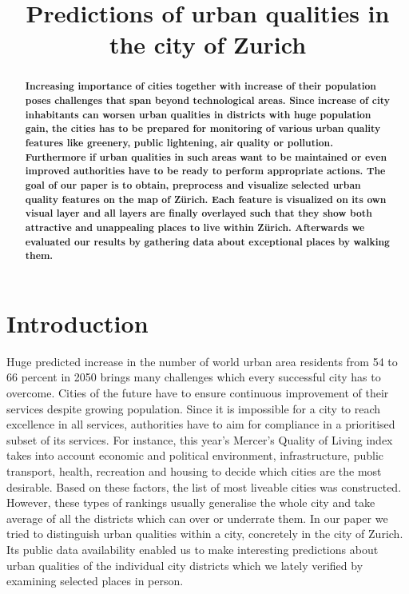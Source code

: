 \documentclass[letterpaper]{article}
\title{Predictions of urban qualities in the city of Zurich}
\begin{document}
%
\maketitle
%

\begin{abstract}
\textbf{
Increasing importance of cities together with increase of their population poses challenges that span beyond
technological areas. Since increase of city inhabitants can worsen urban qualities in districts with huge
population gain, the cities has to be prepared for monitoring of various urban quality features like greenery,
public lightening, air quality or pollution. Furthermore if urban qualities in such areas want to be maintained or
even improved authorities have to be ready to perform appropriate actions. The goal of our paper is to obtain,
preprocess and visualize selected urban quality features on the map of Zürich. Each feature is visualized
on its own visual layer and all layers are finally overlayed such that they show both attractive and unappealing
places to live within Zürich. Afterwards we evaluated our results by gathering data about exceptional places
by walking them.
}
\end{abstract}

\section{Introduction}\label{sec:intro}
Huge predicted increase in the number of world urban area residents from 54 to 66 percent in 2050 brings many challenges
which every successful city has to overcome. Cities of the future have to ensure continuous improvement of their
services despite growing population. Since it is impossible for a city to reach excellence in all services,
authorities have to aim for compliance in a prioritised subset of its services. For instance, this year's Mercer's Quality of Living index\cite{mercer}
takes into account economic and political environment, infrastructure, public transport, health, recreation and housing
to decide which cities are the most desirable. Based on these factors, the list of most liveable cities was constructed.
However, these types of rankings usually generalise the whole city and take average of all the districts which can
over or underrate them. In our paper we tried to distinguish urban qualities within a city, concretely in the city of Zurich.
Its public data availability enabled us to make interesting predictions about urban qualities of the individual city districts
which we lately verified by examining selected places in person.
\end{document}
